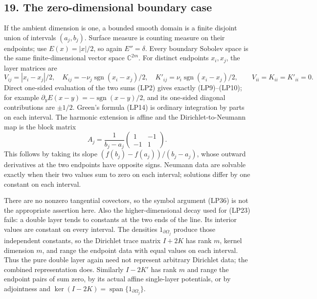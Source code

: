 \documentclass[
  11pt,
]{article}
\makeatletter
\let\ReaderOriginalAnchorStart\hyper@anchorstart
\let\ReaderOriginalAnchorEnd\hyper@anchorend
\let\ReaderPendingAliases\@empty
\def\ReaderArmAliases#1{\gdef\ReaderPendingAliases{#1}}
\def\hyper@anchorstart#1{\ReaderIfNativeAnchorTF{#1}{\ReaderPendingAliases\global\let\ReaderPendingAliases\@empty}{}\ReaderOriginalAnchorStart{#1}}
\makeatother
\begin{document}
\ReaderArmAliases{\ReaderOriginalAnchorStart{AN03-SBD-019}\ReaderOriginalAnchorEnd\begingroup\expandafter\def\csname @currentHref\endcsname{AN03-SBD-019}\label{AN03-SBD-019}\endgroup\ReaderOriginalAnchorStart{an03-sbd-019-the-zero-dimensional-boundary-case}\ReaderOriginalAnchorEnd\begingroup\expandafter\def\csname @currentHref\endcsname{an03-sbd-019-the-zero-dimensional-boundary-case}\label{an03-sbd-019-the-zero-dimensional-boundary-case}\endgroup\ReaderOriginalAnchorStart{19-the-zero-dimensional-boundary-case}\ReaderOriginalAnchorEnd\begingroup\expandafter\def\csname @currentHref\endcsname{19-the-zero-dimensional-boundary-case}\label{19-the-zero-dimensional-boundary-case}\endgroup\ReaderOriginalAnchorStart{the-zero-dimensional-boundary-case}\ReaderOriginalAnchorEnd}
\subsection{19. The zero-dimensional boundary
case}\label{the-zero-dimensional-boundary-case}

If the ambient dimension is one, a bounded smooth domain is a finite
disjoint union of intervals \((a_j,b_j)\). Surface measure is counting
measure on their endpoints; use \(E(x)=|x|/2\), so again \(E''=\delta\).
Every boundary Sobolev space is the same finite-dimensional vector space
\(\mathbb C^{2m}\). For distinct endpoints \(x_i,x_j\), the layer
matrices are \[
 V_{ij}=|x_i-x_j|/2,\quad
 K_{ij}=-\nu_j\operatorname{sgn}(x_i-x_j)/2,\quad
 K'_{ij}=\nu_i\operatorname{sgn}(x_i-x_j)/2,
 \qquad V_{ii}=K_{ii}=K'_{ii}=0.
 \tag{LP37}
\] Direct one-sided evaluation of the two sums (LP2) gives exactly
(LP9)--(LP10); for example
\(\partial_{y}E(x-y)=-\operatorname{sgn}(x-y)/2\), and its one-sided
diagonal contributions are \(\pm1/2\). Green's formula (LP14) is
ordinary integration by parts on each interval. The harmonic extension
is affine and the Dirichlet-to-Neumann map is the block matrix \[
 A_j=\frac1{b_j-a_j}\begin{pmatrix}1&-1\\-1&1\end{pmatrix}.
 \tag{LP38}
\] This follows by taking its slope \((f(b_j)-f(a_j))/(b_j-a_j)\), whose
outward derivatives at the two endpoints have opposite signs. Neumann
data are solvable exactly when their two values sum to zero on each
interval; solutions differ by one constant on each interval.

There are no nonzero tangential covectors, so the symbol argument (LP36)
is not the appropriate assertion here. Also the higher-dimensional decay
used for (LP23) fails: a double layer tends to constants at the two ends
of the line. Its interior values are constant on every interval. The
densities \(1_{\partial\Omega_j}\) produce those independent constants,
so the Dirichlet trace matrix \(I+2K\) has rank \(m\), kernel dimension
\(m\), and range the endpoint data with equal values on each interval.
Thus the pure double layer again need not represent arbitrary Dirichlet
data; the combined representation does. Similarly \(I-2K'\) has rank
\(m\) and range the endpoint pairs of sum zero, by its actual affine
single-layer potentials, or by adjointness and
\(\ker(I-2K)=\operatorname{span}\{1_{\partial\Omega_j}\}\).
\end{document}
